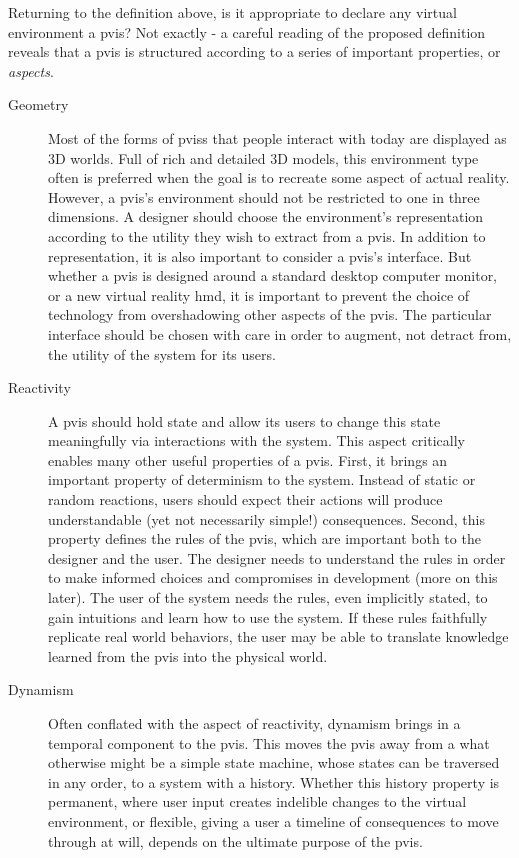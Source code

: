 \documentclass[12pt,oneside,letterpaper]{memoir}
\begin{document}
Returning to the definition above, is it appropriate to
declare any virtual environment a \gls{pvis}? Not exactly - a careful
reading of the proposed definition reveals that a \gls{pvis} is
structured according to a series of important properties, or \textit{aspects}.

\begin{description}
\item[Geometry] Most of the forms of \glspl{pvis} that people interact
  with today are displayed as 3D worlds. Full of rich and detailed 3D
  models, this environment type often is preferred when the goal is to
  recreate some aspect of actual reality. However, a \gls{pvis}'s
  environment should not be restricted to one in three dimensions. A
  designer should choose the environment's representation according to
  the utility they wish to extract from a \gls{pvis}. In addition to
  representation, it is also important to consider a \gls{pvis}'s
  interface. But whether a \gls{pvis} is designed around a standard
  desktop computer monitor, or a new virtual reality \gls{hmd}, it is
  important to prevent the choice of technology from overshadowing
  other aspects of the \gls{pvis}. The particular interface should be
  chosen with care in order to augment, not detract from, the utility of
  the system for its users.

\item[Reactivity] A \gls{pvis} should hold state and allow its
  users to change this state meaningfully via interactions with the system. This
  aspect critically enables many other useful properties of a
  \gls{pvis}. First, it brings an important property of determinism
  to the system. Instead of static or random reactions, users should
  expect their actions will produce understandable (yet not
  necessarily simple!) consequences. Second, this property defines the rules of
  the \gls{pvis}, which are important both to the designer and the
  user. The designer needs to understand the rules in order to make
  informed choices and compromises in development (more on this
  later). The user of the system needs the rules, even implicitly
  stated, to gain intuitions and learn how to use the system. If these
  rules faithfully replicate real world behaviors, the user may be
  able to translate knowledge learned from the \gls{pvis} into the
  physical world.
  
\item[Dynamism] Often conflated with the aspect of reactivity, dynamism
  brings in a temporal component to the \gls{pvis}. This moves the \gls{pvis} away
  from a what otherwise might be a simple state machine, whose states
  can be traversed in any order, to a system with a history. Whether
  this history property is permanent, where user input creates
  indelible changes to the virtual environment, or flexible, giving a
  user a timeline of consequences to move through at will, depends on the
  ultimate purpose of the \gls{pvis}. 


\end{description}
\end{document}

